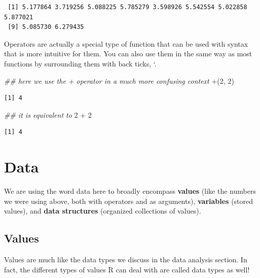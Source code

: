 \documentclass[
  letterpaper,
  DIV=11,
  numbers=noendperiod]{scrreprt}
\newenvironment{Shaded}{\begin{snugshade}}{\end{snugshade}}
\newcommand{\AttributeTok}[1]{\textcolor[rgb]{0.40,0.45,0.13}{#1}}
\newcommand{\DecValTok}[1]{\textcolor[rgb]{0.68,0.00,0.00}{#1}}
\newcommand{\DocumentationTok}[1]{\textcolor[rgb]{0.37,0.37,0.37}{\textit{#1}}}
\newcommand{\NormalTok}[1]{\textcolor[rgb]{0.00,0.23,0.31}{#1}}
\newcommand{\SpecialCharTok}[1]{\textcolor[rgb]{0.37,0.37,0.37}{#1}}
\newcommand{\StringTok}[1]{\textcolor[rgb]{0.13,0.47,0.30}{#1}}
\begin{document}
\begin{verbatim}
 [1] 5.177864 3.719256 5.088225 5.785279 3.598926 5.542554 5.022858 5.877021
 [9] 5.085730 6.279435
\end{verbatim}

Operators are actually a special type of function that can be used with
syntax that is more intuitive for them. You can also use them in the
same way as most functions by surrounding them with back ticks, `.

\begin{Shaded}
\begin{Highlighting}[]
\DocumentationTok{\#\# here we use the + operator in a much more confusing context}
\StringTok{\textasciigrave{}}\AttributeTok{+}\StringTok{\textasciigrave{}}\NormalTok{(}\DecValTok{2}\NormalTok{, }\DecValTok{2}\NormalTok{)}
\end{Highlighting}
\end{Shaded}

\begin{verbatim}
[1] 4
\end{verbatim}

\begin{Shaded}
\begin{Highlighting}[]
\DocumentationTok{\#\# it is equivalent to}
\DecValTok{2} \SpecialCharTok{+} \DecValTok{2}
\end{Highlighting}
\end{Shaded}

\begin{verbatim}
[1] 4
\end{verbatim}

\section{Data}\label{data}

We are using the word data here to broadly encompass \textbf{values}
(like the numbers we were using above, both with operators and as
arguments), \textbf{variables} (stored values), and \textbf{data
structures} (organized collections of values).

\subsection{Values}\label{values}

Values are much like the data types we discuss in the data analysis
section. In fact, the different types of values R can deal with are
called data types as well!
\end{document}

